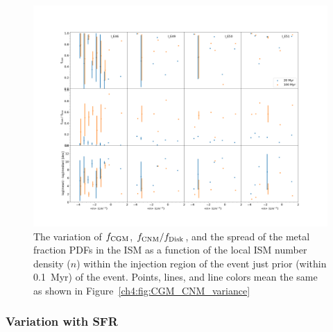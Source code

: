  \begin{figure}
   \centering
   \includegraphics[angle=90,width=0.9\linewidth]{figures/ch4/II_n_dependence}
   \caption{The variation of $f_{\rm CGM}$, $f_{\rm CNM} / f_{\rm Disk}$, and the spread of the metal fraction PDFs in the ISM as a function of the local ISM number density ($n$) within the injection region of the event just prior (within 0.1~Myr) of the event. Points, lines, and line colors mean the same as shown in Figure~\ref{ch4:fig:CGM_CNM_variance}}
   \label{ch4:fig:ISM_variance}
 \end{figure}


\subsubsection{Variation with SFR}
\label{ch4:sec:SFR}

